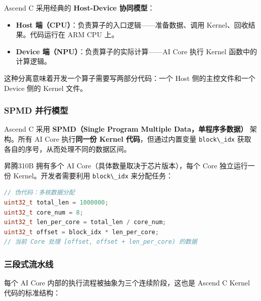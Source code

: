 Ascend C 采用经典的 \textbf{Host-Device 协同模型}：

\begin{itemize}
\tightlist
\item
  \textbf{Host 端（CPU）}：负责算子的入口逻辑------准备数据、调用
  Kernel、回收结果。代码运行在 ARM CPU 上。
\item
  \textbf{Device 端（NPU）}：负责算子的实际计算------AI Core 执行 Kernel
  函数中的计算逻辑。
\end{itemize}

这种分离意味着开发一个算子需要写两部分代码：一个 Host 侧的主控文件和一个
Device 侧的 Kernel 文件。

\subsubsection{SPMD 并行模型}\label{src-book-chapter7-h45}

Ascend C 采用 \textbf{SPMD（Single Program Multiple
Data，单程序多数据）} 架构。所有 AI Core 执行\textbf{同一份 Kernel
代码}，但通过内置变量 \passthrough{\lstinline!block\_idx!}
获取各自的序号，从而处理不同的数据区间。

昇腾310B 拥有多个 AI Core（具体数量取决于芯片版本），每个 Core
独立运行一份 Kernel。开发者需要利用 \passthrough{\lstinline!block\_idx!}
来分配任务：

\begin{lstlisting}[language={C++}]
// 伪代码：多核数据分配
uint32_t total_len = 1000000;
uint32_t core_num = 8;
uint32_t len_per_core = total_len / core_num;
uint32_t offset = block_idx * len_per_core;
// 当前 Core 处理 [offset, offset + len_per_core) 的数据
\end{lstlisting}

\subsubsection{三段式流水线}\label{src-book-chapter7-h46}

每个 AI Core 内部的执行流程被抽象为三个连续阶段，这也是 Ascend C Kernel
代码的标准结构：

